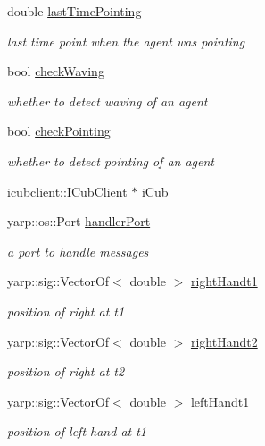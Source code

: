 \begin{DoxyCompactItemize}
double \hyperlink{group__pasar_a0b488dc62d174ea71ec6edbea36e746f}{last\+Time\+Pointing}
\begin{DoxyCompactList}\small\item\em last time point when the agent was pointing \end{DoxyCompactList}\item 
bool \hyperlink{group__pasar_a1565ab479eb670f9b0f2fac851d04d4f}{check\+Waving}
\begin{DoxyCompactList}\small\item\em whether to detect waving of an agent \end{DoxyCompactList}\item 
bool \hyperlink{group__pasar_ac1e13b244af26bd77812305485c8c150}{check\+Pointing}
\begin{DoxyCompactList}\small\item\em whether to detect pointing of an agent \end{DoxyCompactList}\item 
\hyperlink{group__icubclient__clients_classicubclient_1_1ICubClient}{icubclient\+::\+I\+Cub\+Client} $\ast$ \hyperlink{group__pasar_a3f1698bbf327cebc9f30354b552abfaf}{i\+Cub}
\item 
yarp\+::os\+::\+Port \hyperlink{group__pasar_ab8c417213c0beb8e580d8fb2b1eebb66}{handler\+Port}
\begin{DoxyCompactList}\small\item\em a port to handle messages \end{DoxyCompactList}\item 
yarp\+::sig\+::\+Vector\+Of$<$ double $>$ \hyperlink{group__pasar_aab32988108828bc5647394433f17a896}{right\+Handt1}
\begin{DoxyCompactList}\small\item\em position of right at t1 \end{DoxyCompactList}\item 
yarp\+::sig\+::\+Vector\+Of$<$ double $>$ \hyperlink{group__pasar_ae5e94f066c3ecf8eebd2db8ec19f948f}{right\+Handt2}
\begin{DoxyCompactList}\small\item\em position of right at t2 \end{DoxyCompactList}\item 
yarp\+::sig\+::\+Vector\+Of$<$ double $>$ \hyperlink{group__pasar_a9bd22f6f18bdb9d5acb8b8fb8858716f}{left\+Handt1}
\begin{DoxyCompactList}\small\item\em position of left hand at t1 \end{DoxyCompactList}\item 

\end{DoxyCompactItemize}
